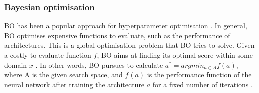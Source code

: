 \subsubsection{Bayesian optimisation}
\Gls{BO} has been a popular approach for hyperparameter optimisation \autocite{elsken2019neural}. In general, \gls{BO} optimises expensive functions to evaluate, such as the performance of architectures. This is a global optimisation problem that \gls{BO} tries to solve. Given a costly to evaluate function $f$, \gls{BO} aims at finding its optimal score within some domain $x$ \autocite{kandasamy2018neural}. In other words, \gls{BO} pursues to calculate $a^* = arg min_{a \in A} f(a)$, where A is the given search space, and $f(a)$ is the performance function of the neural network after training the architecture $a$ for a fixed number of iterations \autocite{white2021bananas}.  
